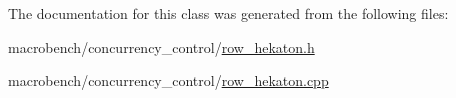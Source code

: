 The documentation for this class was generated from the following files\+:\begin{DoxyCompactItemize}
\item 
macrobench/concurrency\+\_\+control/\hyperlink{row__hekaton_8h}{row\+\_\+hekaton.\+h}\item 
macrobench/concurrency\+\_\+control/\hyperlink{row__hekaton_8cpp}{row\+\_\+hekaton.\+cpp}\end{DoxyCompactItemize}
